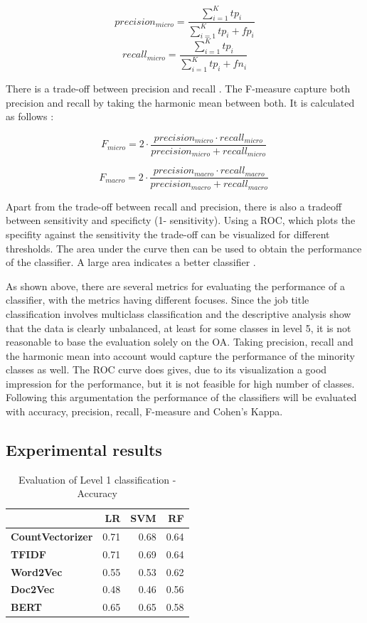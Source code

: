 \documentclass[12pt, a4paper, titlepage]{article}
\begin{document}
\[precision_{micro} = \frac{\sum_{i=1}^K tp_i}{\sum_{i=1}^K tp_i + fp_i}\]
\[recall_{micro} = \frac{\sum_{i=1}^K tp_i}{\sum_{i=1}^K tp_i + fn_i}\]

There is a trade-off between precision and recall \citep{Buckland1994}. The F-measure capture both precision and recall by taking the harmonic mean between both. It is calculated as follows \citep{Branco2017,Pan2016}:  

\[F_{micro} = 2 \cdot \frac{precision_{micro} \cdot recall_{micro} }{precision_{micro} + recall_{micro} }\ \]

\[F_{macro} = 2 \cdot \frac{precision_{macro} \cdot recall_{macro} }{precision_{macro} + recall_{macro} }\ \]

Apart from the trade-off between recall and precision, there is also a tradeoff between sensitivity and specificty (1- sensitivity). Using a \ac{ROC}, which plots the specifity against the sensitivity the trade-off can be visualized for different thresholds. The area under the curve then can be used to obtain the performance of the classifier. A large area indicates a better classifier \citep{Berthold2020, Espindola2005}. 

As shown above, there are several metrics for evaluating the performance of a classifier, with the metrics having different focuses. Since the job title classification involves multiclass classification and the descriptive analysis show that the data is clearly unbalanced, at least for some classes in level 5, it is not reasonable to base the evaluation solely on the \ac{OA}. Taking precision, recall and the harmonic mean into account would capture the performance of the minority classes as well. The \ac{ROC} curve does gives, due to its visualization a good impression for the performance, but it is not feasible for high number of classes. Following this argumentation the performance of the classifiers will be evaluated with accuracy, precision, recall, F-measure and Cohen's Kappa. 


\subsection{Experimental results}

\begin{table}[]
  \centering
\begin{tabular}{lrrr}
  \hline
  {} &    \textbf{LR} &   \textbf{SVM} &    \textbf{RF} \\
  \hline
  \textbf{CountVectorizer} &  0.71 &  0.68 &  0.64 \\
  \textbf{TFIDF}           &  0.71 &  0.69 &  0.64 \\
  \textbf{Word2Vec}        &  0.55 &  0.53 &  0.62 \\
  \textbf{Doc2Vec}         &  0.48 &  0.46 &  0.56 \\
  \textbf{BERT}         &  0.65 &  0.65 &  0.58 \\
  \hline
  \end{tabular}
  \caption{\label{tab: T5} Evaluation of Level 1 classification - Accuracy}
\end{table}
\end{document}
